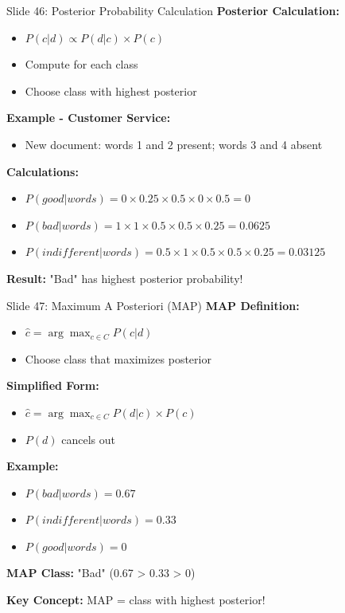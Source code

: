 \documentclass[8pt]{beamer}
\begin{document}
	\begin{frame}{Slide 46: Posterior Probability Calculation}
		\fontsize{6.5}{7.5}\selectfont
		\textbf{Posterior Calculation:}
		\begin{itemize}
			\item $P(c|d) \propto P(d|c) \times P(c)$
			\item Compute for each class
			\item Choose class with highest posterior
		\end{itemize}
		
		\vspace{0.1cm}
		\textbf{Example - Customer Service:}
		\begin{itemize}
			\item New document: words 1 and 2 present; words 3 and 4 absent
		\end{itemize}
		
		\vspace{0.1cm}
		\textbf{Calculations:}
		\begin{itemize}
			\item $P(good|words) = 0 \times 0.25 \times 0.5 \times 0 \times 0.5 = 0$
			\item $P(bad|words) = 1 \times 1 \times 0.5 \times 0.5 \times 0.25 = 0.0625$
			\item $P(indifferent|words) = 0.5 \times 1 \times 0.5 \times 0.5 \times 0.25 = 0.03125$
		\end{itemize}
		
		\textcolor{myblue}{\textbf{Result:}} "Bad" has highest posterior probability!
	\end{frame}
	
	\begin{frame}{Slide 47: Maximum A Posteriori (MAP)}
		\fontsize{6.5}{7.5}\selectfont
		\textbf{MAP Definition:}
		\begin{itemize}
			\item $\hat{c} = \arg\max_{c \in C} P(c|d)$
			\item Choose class that maximizes posterior
		\end{itemize}
		
		\vspace{0.1cm}
		\textbf{Simplified Form:}
		\begin{itemize}
			\item $\hat{c} = \arg\max_{c \in C} P(d|c) \times P(c)$
			\item $P(d)$ cancels out
		\end{itemize}
		
		\vspace{0.1cm}
		\textbf{Example:}
		\begin{itemize}
			\item $P(bad|words) = 0.67$
			\item $P(indifferent|words) = 0.33$
			\item $P(good|words) = 0$
		\end{itemize}
		
		\textbf{MAP Class:} "Bad" (0.67 > 0.33 > 0)
		
		\textcolor{myblue}{\textbf{Key Concept:}} MAP = class with highest posterior!
	\end{frame}
	
\end{document}
